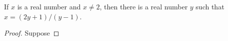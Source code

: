 
\begin{theorem}
  If $x$ is a real number and $x \ne 2$, then there is a real number $y$ such
  that $x = (2y+1) / (y-1)$.
\end{theorem}

\begin{proof}
  Suppose
\end{proof}



\begin{align*}
\end{align*}

